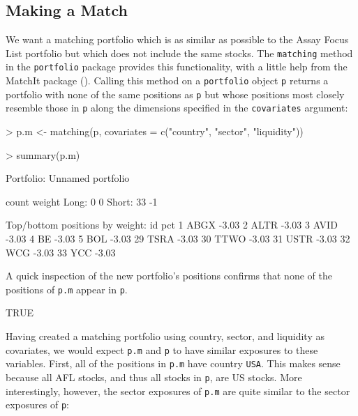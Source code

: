 \documentclass{article}
\begin{document}
\subsection{Making a Match}

We want a matching portfolio which is as similar as possible to the
Assay Focus List portfolio but which does not include the same stocks.
The \texttt{matching} method in the \texttt{portfolio} package
provides this functionality, with a little help from the MatchIt
package (\cite{matchit.pkg}).  Calling this method on a
\texttt{portfolio} object \texttt{p} returns a portfolio with none of
the same positions as \texttt{p} but whose positions most closely
resemble those in \texttt{p} along the dimensions specified in the
\texttt{covariates} argument:

\begin{Schunk}
\begin{Sinput}
> p.m <- matching(p, covariates = c("country", "sector", "liquidity"))
\end{Sinput}
\end{Schunk}
\begin{Schunk}
\begin{Sinput}
> summary(p.m)
\end{Sinput}
\begin{Soutput}
Portfolio: Unnamed portfolio

        count       weight
Long:       0            0 
Short:     33           -1 

Top/bottom positions by weight:
     id   pct
1  ABGX -3.03
2  ALTR -3.03
3  AVID -3.03
4    BE -3.03
5   BOL -3.03
29 TSRA -3.03
30 TTWO -3.03
31 USTR -3.03
32  WCG -3.03
33  YCC -3.03
\end{Soutput}
\end{Schunk}

A quick inspection of the new portfolio's positions confirms that none
of the positions of \texttt{p.m} appear in \texttt{p}.

\begin{Schunk}
\begin{Soutput}
[1] TRUE
\end{Soutput}
\end{Schunk}

Having created a matching portfolio using country, sector, and
liquidity as covariates, we would expect \texttt{p.m} and \texttt{p}
to have similar exposures to these variables.  First, all of the
positions in \texttt{p.m} have country \texttt{USA}.  This makes sense
because all AFL stocks, and thus all stocks in \texttt{p}, are US
stocks.  More interestingly, however, the sector exposures of
\texttt{p.m} are quite similar to the sector exposures of \texttt{p}:
\end{document}
